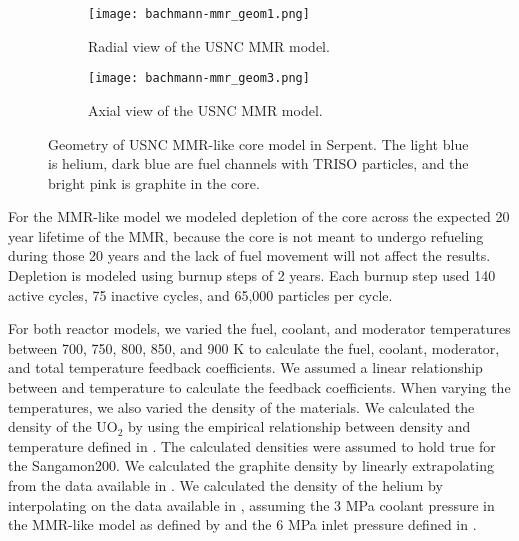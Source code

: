 \begin{figure}
        \begin{subfigure}{0.48\textwidth}
                \centering
                \texttt{[image: bachmann-mmr\_geom1.png]}
                \caption{Radial view of the USNC MMR model.}
                \label{fig:mmr_radial}
        \end{subfigure}
        \hfill 
        \begin{subfigure}{0.48\textwidth}
                \centering
                \texttt{[image: bachmann-mmr\_geom3.png]}
                \caption{Axial view of the USNC MMR model.}
                \label{fig:mmr_axial}
        \end{subfigure}
        \caption{Geometry of USNC MMR-like core model in Serpent. The 
        light blue is helium, dark blue are fuel channels with TRISO particles, 
        and the bright pink is graphite in the core.}
        \label{fig:mmr_core}
\end{figure}

For the \gls{MMR}-like model we modeled depletion of the core across the 
expected 20 year lifetime of the \gls{MMR}, because the core is not 
meant to undergo refueling during those 20 years and the lack of 
fuel movement will not affect the results. Depletion is modeled using 
burnup steps of 2 years. Each burnup step used 140 active cycles, 75 inactive 
cycles, and 65,000 particles per cycle. 

For both reactor models, we varied the fuel, coolant, and moderator temperatures 
between 700, 750, 800, 850, and 900 K to calculate the fuel, coolant, 
moderator, and total temperature feedback coefficients. We assumed a linear 
relationship between 
\keff and temperature to calculate the feedback coefficients. When varying the 
temperatures, we also varied the density of the materials. We calculated the 
density of the UO$_2$ by using the empirical relationship between density and 
temperature defined in \cite{fink_thermophysical_2000}. The calculated 
densities were assumed to hold true for the Sangamon200. 
We calculated the 
graphite density by linearly extrapolating from the data available in 
\cite{mceligot_thermal_nodate}. We calculated the density of the helium 
by interpolating on the data available in \cite{petersen_properties_nodate}, 
assuming the 3 MPa coolant pressure in the \gls{MMR}-like model as defined 
by \cite{noauthor_usnc_2021} and the 6 MPa inlet pressure defined in 
\cite{mulder_overview_2021}. 

